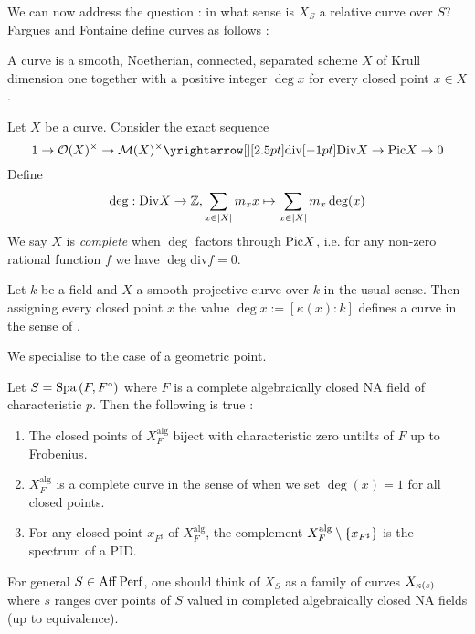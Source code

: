 \documentclass{article}
\begin{document}
We can now address the question : 
in what sense is $X_S$ a relative curve over $S$?
Fargues and Fontaine define curves as follows :
\begin{dfn}
  
  A curve is a smooth, Noetherian, connected, separated scheme $X$
  of Krull dimension one together with
  a positive integer $\deg x$ for every closed point $x \in X$.
  \cite[Def. 5.1.1]{FF18}

  Let $X$ be a curve.
  Consider the exact sequence \[
    1 \to \cO(X)^\times \to \cM(X)^\times \map{\mathrm{div}}{} \DIV X \to \PIC X \to 0
  \]
  Define \[
    \deg : \mathrm{Div} X \to \mathbb{Z} , \sum_{x \in \left\vert X \right\vert} m_x x \mapsto 
    \sum_{x \in \left\vert X \right\vert} m_x \deg(x)
  \]
  We say $X$ is \emph{complete} when $\deg$ factors through $\mathrm{Pic} X$,
  i.e. for any non-zero rational function $f$ we have $\deg \mathrm{div} f = 0$.
\end{dfn}
\begin{eg}
  Let $k$ be a field and $X$ a smooth projective curve over $k$
  in the usual sense.
  Then assigning every closed point $x$ the value
  $\deg x := [\kappa(x) : k]$ defines a curve in the sense of \cite{FF18}.
\end{eg}
We specialise to the case of a geometric point.
\begin{prop}
  
  Let $S = \mathrm{Spa}\,(F , F^\circ)$ where
  $F$ is a complete algebraically closed NA field of characteristic $p$.
  Then the following is true : 
  \begin{enumerate}
    \item The closed points of $X_F^{\mathrm{alg}}$
    biject with characteristic zero untilts of $F$ up to Frobenius.
    \item $X_F^\mathrm{alg}$ is a complete curve in the sense of \cite{FF18}
    when we set $\deg(x) = 1$ for all closed points.
    \item For any closed point $x_{F^\sharp}$ of $X_F^{\mathrm{alg}}$,
    the complement $X_{F}^{\mathrm{alg}}\setminus\left\{x_{F^\sharp}\right\}$
    is the spectrum of a PID.
  \end{enumerate}
  \cite[Theorem 6.5.2]{FF18}
\end{prop}
For general $S \in \mathrm{Aff}\operatorname{Perf}$,
one should think of $X_S$ as a family of curves
$X_{\kappa(s)}$ where $s$ ranges over points of $S$
valued in completed algebraically closed NA fields (up to equivalence).
\end{document}
